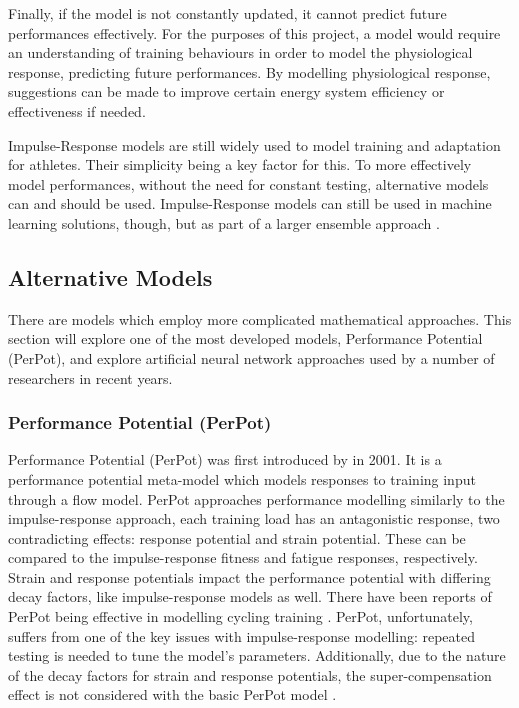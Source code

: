 Finally, if the model is not constantly updated, it cannot predict future performances effectively. For the purposes of this project, a model would require an understanding of training behaviours in order to model the physiological response, predicting future performances. By modelling physiological response, suggestions can be made to improve certain energy system efficiency or effectiveness if needed. 

Impulse-Response models are still widely used to model training and adaptation for athletes. Their simplicity being a key factor for this. To more effectively model performances, without the need for constant testing, alternative models can and should be used. Impulse-Response models can still be used in machine learning solutions, though, but as part of a larger ensemble approach \cite{Imbach2022}.

\subsection{Alternative Models}
There are models which employ more complicated mathematical approaches. This section will explore one of the most developed models, Performance Potential (PerPot), and explore artificial neural network approaches used by a number of researchers in recent years.

\subsubsection{Performance Potential (PerPot)}
Performance Potential (PerPot) was first introduced by \textcite{perl2001} in 2001. It is a performance potential meta-model which models responses to training input through a flow model. PerPot approaches performance modelling similarly to the impulse-response approach, each training load has an antagonistic response, two contradicting effects: response potential and strain potential. These can be compared to the impulse-response fitness and fatigue responses, respectively. Strain and response potentials impact the performance potential with differing decay factors, like impulse-response models as well. There have been reports of PerPot being effective in modelling cycling training \cite{Churchill2014}. PerPot, unfortunately, suffers from one of the key issues with impulse-response modelling: repeated testing is needed to tune the model's parameters. Additionally, due to the nature of the decay factors for strain and response potentials, the super-compensation effect is not considered with the basic PerPot model \cite{Churchill2014}. 

